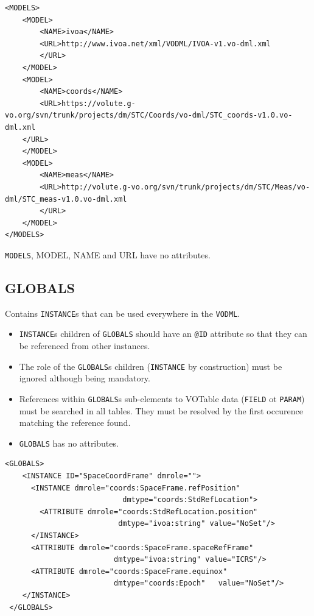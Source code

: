 \documentclass[11pt,a4paper]{ivoa}
\begin{document}
\begin{lstlisting}[caption={GLOBALS block example},captionpos=b]
<MODELS>
    <MODEL>
        <NAME>ivoa</NAME>
        <URL>http://www.ivoa.net/xml/VODML/IVOA-v1.vo-dml.xml
        </URL>
    </MODEL>
    <MODEL>
        <NAME>coords</NAME>
        <URL>https://volute.g-vo.org/svn/trunk/projects/dm/STC/Coords/vo-dml/STC_coords-v1.0.vo-dml.xml
    </URL>
    </MODEL>
    <MODEL>
        <NAME>meas</NAME>
        <URL>http://volute.g-vo.org/svn/trunk/projects/dm/STC/Meas/vo-dml/STC_meas-v1.0.vo-dml.xml
        </URL>
    </MODEL>
</MODELS>
\end{lstlisting}

 \texttt{MODELS},  {MODEL},  {NAME} and {URL}  have no attributes. 
 

\subsection{GLOBALS}
 Contains  \texttt{INSTANCE}s  that can be used everywhere in the \texttt{VODML}.
\begin{itemize}
    \item \texttt{INSTANCE}s children of \texttt{GLOBALS} should have an  \texttt{@ID} attribute so that they can be referenced from other instances.
    \item The role of the \texttt{GLOBALS}s children (\texttt{INSTANCE} by construction) must be ignored although being mandatory.
    \item References within \texttt{GLOBALS}s  sub-elements to VOTable data (\texttt{FIELD} ot \texttt{PARAM}) must be searched in all tables. 
            They must be resolved by the first occurence matching the reference found.
    \item \texttt{GLOBALS} has no attributes. 
\end{itemize}

\begin{lstlisting}[caption={GLOBALS block example},captionpos=b]
  <GLOBALS>
    <INSTANCE ID="SpaceCoordFrame" dmrole="">
      <INSTANCE dmrole="coords:SpaceFrame.refPosition" 
                           dmtype="coords:StdRefLocation">
        <ATTRIBUTE dmrole="coords:StdRefLocation.position" 
                          dmtype="ivoa:string" value="NoSet"/>
      </INSTANCE>
      <ATTRIBUTE dmrole="coords:SpaceFrame.spaceRefFrame" 
                         dmtype="ivoa:string" value="ICRS"/>
      <ATTRIBUTE dmrole="coords:SpaceFrame.equinox" 
                         dmtype="coords:Epoch"   value="NoSet"/>
    </INSTANCE>
 </GLOBALS>
\end{lstlisting}
\end{document}

